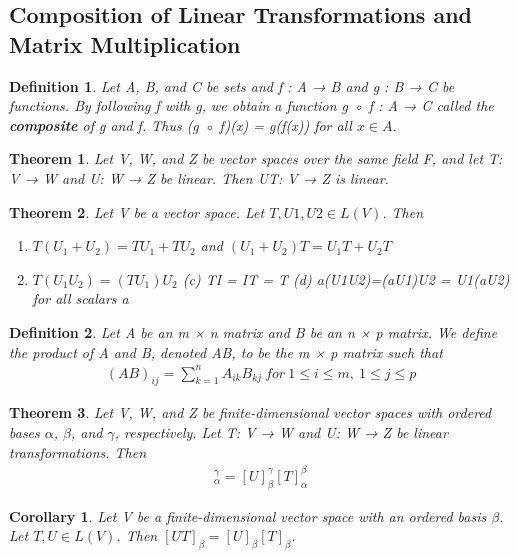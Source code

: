 \documentclass{article}
\newcommand{\bd}[1]{\textbf{#1}}
\theoremstyle{plain}
\newtheorem{theorem}{Theorem}[section]
\newtheorem*{corollary}{Corollary}
\newtheorem*{definition1}{Definition}
\theoremstyle{plain} %
\begin{document}
\subsection {Composition of Linear Transformations and Matrix Multiplication}

\begin{definition1}
Let A, B, and C be sets and f : A → B and g : B → C be functions. By following f with g, we obtain a function g ◦ f : A → C called the \bd{composite} of g and f. Thus (g ◦ f)(x) = g(f(x)) for all $x \in A$. 
\end{definition1}

\begin{theorem}
Let V, W, and Z be vector spaces over the same field F, and let T: V → W and U: W → Z be linear. Then UT: V → Z is linear.
\end{theorem}

\begin{theorem}
Let V be a vector space. Let $T,U1,U2 \in L(V)$. Then
\begin{enumerate}[label=(\alph*)]
\item $T(U_1 + U_2) = TU_1 + TU_2$ and $(U_1 + U_2)T = U_1T + U_2T$
\item $T(U_1U_2)=(TU_1)U_2$
(c) TI = IT = T
(d) a(U1U2)=(aU1)U2 = U1(aU2) for all scalars a
\end{enumerate}
\end{theorem}

\begin{definition1}
Let A be an m × n matrix and B be an n × p matrix. We define the product of A and B, denoted AB, to be the m × p matrix such
that
\begin{align*}
(AB)_{ij}=\sum_{k=1}^n A_{ik}B_{kj}~for~1\leq i\leq m, ~1\leq j\leq p
\end{align*}
\end{definition1}

\begin{theorem}
Let V, W, and Z be finite-dimensional vector spaces with ordered bases $\alpha$, $\beta$, and $\gamma$, respectively. Let T: V → W and U: W → Z be linear transformations. Then
\begin{align*}
[UT]_\alpha^\gamma=[U]_\beta^\gamma[T]_\alpha^\beta
\end{align*}
\end{theorem}

\begin{corollary}
Let V be a finite-dimensional vector space with an ordered basis $\beta$. Let $T,U \in L(V)$. Then $[UT]_\beta = [U]_\beta[T]_\beta$.
\end{corollary}
\end{document}
